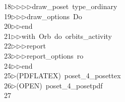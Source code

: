 \begin{tabbing}
18\>$\triangleright$\>$\triangleright$\>$\triangleright$\>$\triangleright$\>draw\_poset\ type\_ordinary\ \\[0pt]
19\>$\triangleright$\>$\triangleright$\>$\triangleright$\>draw\_options\ Do\ \\[0pt]
20\>$\triangleright$\>$\triangleright$\>end\ \\[0pt]
21\>$\triangleright$\>$\triangleright$\>with\ Orb\ do\ orbits\_activity\ \\[0pt]
22\>$\triangleright$\>$\triangleright$\>$\triangleright$\>report\ \ \\[0pt]
23\>$\triangleright$\>$\triangleright$\>$\triangleright$\>report\_options\ ro\ \\[0pt]
24\>$\triangleright$\>$\triangleright$\>end\\[0pt]
25\>$\triangleright$\>(PDFLATEX)\ poset\_4\_posettex\\[0pt]
26\>$\triangleright$\>(OPEN)\ poset\_4\_posetpdf\\[0pt]
27\>\end{tabbing}

